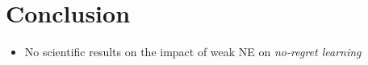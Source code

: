 
\chapter{Conclusion}\label{chapter:conclusion}

\begin{itemize}
    \item No scientific results on the impact of weak NE on \textit{no-regret learning}
\end{itemize}